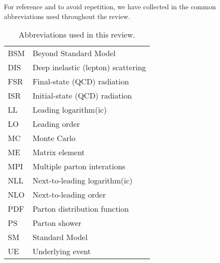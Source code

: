 For reference and to avoid repetition, we have collected in
 the common abbreviations used throughout the review.

\begin{table}
\begin{center}
\begin{tabular}{|l|l|}
\hline
BSM & Beyond Standard Model \\ 
DIS & Deep inelastic (lepton) scattering \\ 
FSR & Final-state (QCD) radiation \\  
ISR & Initial-state (QCD) radiation \\
LL & Leading logarithm(ic) \\
LO & Leading order \\ 
MC & Monte Carlo \\ 
ME & Matrix element \\
MPI & Multiple parton interations \\
NLL & Next-to-leading logarithm(ic) \\
NLO & Next-to-leading order \\
PDF & Parton distribution function \\
PS & Parton shower \\
SM & Standard Model \\ 
UE & Underlying event \\
\hline
\end{tabular}
\caption{ Abbreviations used in this review.\label{tab:abbrev}}
\end{center}
\end{table}

%


